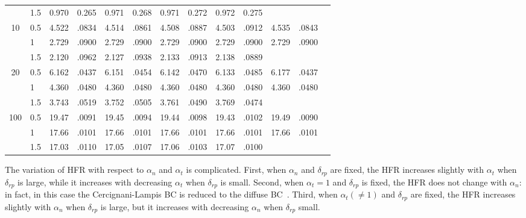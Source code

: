 \begin{table}
\begin{tabular}{clccclccccccc}
	& 1.5 & 0.970 & 0.265 & 0.971 & 0.268 & 0.971 & 0.272 & 0.972 & 0.275 &  &  \\ 
	10 & 0.5 & 4.522 & .0834 & 4.514 & .0861 & 4.508 & .0887 & 4.503 & .0912 & 
	4.535 & .0843  \\ 
	& 1 & 2.729 & .0900 & 2.729 & .0900 & 2.729 & .0900 & 2.729 & .0900 & 2.729
	& .0900   \\ 
	& 1.5 & 2.120 & .0962 & 2.127 & .0938 & 2.133 & .0913 & 2.138 & .0889 &  &   \\ 
	20 & 0.5 & 6.162 & .0437 & 6.151 & .0454 & 6.142 & .0470 & 6.133 & .0485 & 
	6.177 & .0437   \\ 
	& 1 & 4.360 & .0480 & 4.360 & .0480 & 4.360 & .0480 & 4.360 & .0480 & 4.360
	& .0480  \\ 
	& 1.5 & 3.743 & .0519 & 3.752 & .0505 & 3.761 & .0490 & 3.769 & .0474 &  &   \\ 
	100 & 0.5 & 19.47 & .0091 & 19.45 & .0094 & 19.44 & .0098 & 19.43 & .0102 & 
	19.49 & .0090   \\ 
	& 1 & 17.66 & .0101 & 17.66 & .0101 & 17.66 & .0101 & 17.66 & .0101 & 17.66
	& .0101   \\ 
	& 1.5 & 17.03 & .0110 & 17.05 & .0107 & 17.06 & .0103 & 17.07 & .0100 &  & \\
	\hline
\end{tabular}%
	\label{table_poiseuille_1d_BC}
\end{table}




The variation of HFR with respect to $\alpha _{n}$ and $\alpha _{t}$ is complicated. First, when $\alpha _{n}$ and $\delta_{rp}$ are fixed, the HFR increases slightly with $\alpha _{t}$ when $\delta_{rp} $ is large, while it increases with decreasing $\alpha _{t}$ when  $\delta_{rp}$ is small. Second, when $\alpha _{t}=1$ and $\delta_{rp} $ is fixed, the HFR does not change with $\alpha _{n}$: in fact, in this case the Cercignani-Lampis  BC is reduced to the diffuse  BC~\citep{Sharipov2002CL}. Third, when $\alpha_{t}(\neq1)$ and $\delta_{rp} $ are fixed, the HFR increases slightly with $\alpha _{n}$ when $\delta_{rp}$ is large, but it increases with decreasing $\alpha _{n}$ when $\delta_{rp}$ small. 

